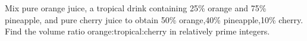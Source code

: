 Mix pure orange juice, a tropical drink containing 25\% orange and 75\% pineapple, and pure cherry juice to obtain 50\% orange,40\% pineapple,10\% cherry. Find the volume ratio orange:tropical:cherry in relatively prime integers.
